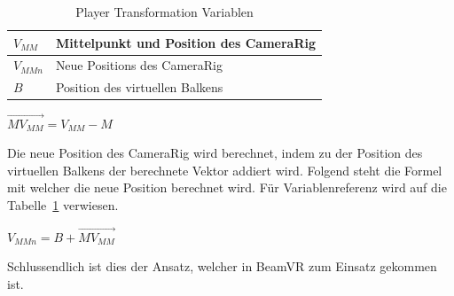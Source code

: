\begin{table}[]
    \centering
    \begin{tabular}{|l|l|}
        \hline
        $V_{MM}$  & Mittelpunkt und Position des CameraRig                  \\ \hline
        $V_{MMn}$ & Neue Positions des CameraRig                            \\ \hline
        $B$       & Position des virtuellen Balkens                         \\ \hline
    \end{tabular}
    \caption{Player Transformation Variablen}
    \label{tab:variables_advanced}
\end{table}

$\vec{MV_{MM}} = V_{MM} - M$

Die neue Position des CameraRig wird berechnet, indem zu der Position des virtuellen Balkens der berechnete Vektor addiert wird.
Folgend steht die Formel mit welcher die neue Position berechnet wird.
Für Variablenreferenz wird auf die Tabelle~\ref{tab:variables_advanced} verwiesen.

$V_{MMn} = B + \vec{MV_{MM}}$

Schlussendlich ist dies der Ansatz, welcher in BeamVR zum Einsatz gekommen ist.
